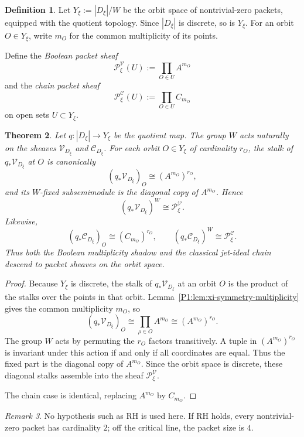 \documentclass[11pt,a4paper]{article}
\numberwithin{equation}{section}
\newtheorem{theorem}{Theorem}[section]
\theoremstyle{definition}
\newtheorem{definition}[theorem]{Definition}
\theoremstyle{remark}
\newtheorem{remark}[theorem]{Remark}
\newcommand{\cV}{\mathcal V}
\newcommand{\cC}{\mathcal C}
\begin{document}
\begin{definition}
Let $Y_\xi:=|D_\xi|/W$ be the orbit space of nontrivial-zero packets, equipped with the quotient topology.  Since $|D_\xi|$ is discrete, so is $Y_\xi$.  For an orbit $O\in Y_\xi$, write $m_O$ for the common multiplicity of its points.

Define the \emph{Boolean packet sheaf}
\[
\mathcal P_\xi^{\cV}(U):=\prod_{O\in U}A^{m_O}
\]
and the \emph{chain packet sheaf}
\[
\mathcal P_\xi^{\cC}(U):=\prod_{O\in U}C_{m_O}
\]
on open sets $U\subset Y_\xi$.
\end{definition}

\begin{theorem}\label{P1:thm:packet-descent}
Let $q:|D_\xi|\to Y_\xi$ be the quotient map.  The group $W$ acts naturally on the sheaves $\cV_{D_\xi}$ and $\cC_{D_\xi}$.  For each orbit $O\in Y_\xi$ of cardinality $r_O$, the stalk of $q_*\cV_{D_\xi}$ at $O$ is canonically
\[
(q_*\cV_{D_\xi})_O\cong (A^{m_O})^{r_O},
\]
and its $W$-fixed subsemimodule is the diagonal copy of $A^{m_O}$.  Hence
\[
(q_*\cV_{D_\xi})^W\cong \mathcal P_\xi^{\cV}.
\]
Likewise,
\[
(q_*\cC_{D_\xi})_O\cong (C_{m_O})^{r_O},
\qquad
(q_*\cC_{D_\xi})^W\cong \mathcal P_\xi^{\cC}.
\]
Thus both the Boolean multiplicity shadow and the classical jet-ideal chain descend to packet sheaves on the orbit space.
\end{theorem}

\begin{proof}
Because $Y_\xi$ is discrete, the stalk of $q_*\cV_{D_\xi}$ at an orbit $O$ is the product of the stalks over the points in that orbit.  Lemma~\ref{P1:lem:xi-symmetry-multiplicity} gives the common multiplicity $m_O$, so
\[
(q_*\cV_{D_\xi})_O\cong \prod_{\rho\in O}A^{m_O}\cong (A^{m_O})^{r_O}.
\]
The group $W$ acts by permuting the $r_O$ factors transitively.  A tuple in $(A^{m_O})^{r_O}$ is invariant under this action if and only if all coordinates are equal.  Thus the fixed part is the diagonal copy of $A^{m_O}$.  Since the orbit space is discrete, these diagonal stalks assemble into the sheaf $\mathcal P_\xi^{\cV}$.

The chain case is identical, replacing $A^{m_O}$ by $C_{m_O}$.
\end{proof}

\begin{remark}
No hypothesis such as RH is used here.  If RH holds, every nontrivial-zero packet has cardinality $2$; off the critical line, the packet size is $4$.
\end{remark}
\end{document}
